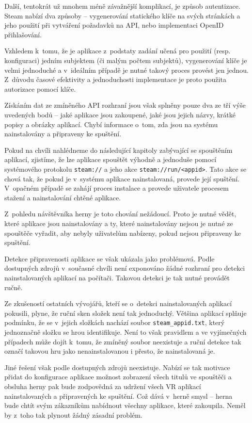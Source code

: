 Další, tentokrát už mnohem méně závažnější komplikací, je způsob
autentizace. Steam nabízí dva způsoby
-- vygenerování statického klíče na svých stránkách a jeho použití
při vytváření požadavků na API, nebo implementaci OpenID přihlašování.

Vzhledem k~tomu, že je aplikace z~podstaty zadání učená pro použití
(resp. konfiguraci) jedním subjektem (či malým počtem subjektů),
vygenerování klíče je velmi jednoduché a v~ideálním případě je nutné
takový proces provést jen jednou. Z~důvodu časové efektivity a 
jednoduchosti implementace je proto použita autorizace pomocí klíče.

Získáním dat ze zmíněného API rozhraní jsou však splněny pouze dva
ze tří výše uvedených bodů -- jaké aplikace jsou zakoupené, jaké jsou
jejich názvy, krátké popisy a obrázky aplikací. Chybí informace o~tom,
zda jsou na systému nainstalovány a připraveny ke spuštění.

Pokud na chvíli nahlédneme do následující kapitoly zabývající se
spouštěním aplikací, zjistíme, že lze aplikace spouštět výhodně a jednoduše pomocí systémového protokolu \texttt{steam://} a jeho akce
\texttt{steam://run/<appid>}. Tato akce se chová
tak, že pokud je v~systému aplikace nainstalovaná, provede její
spuštění. V~opačném případě se zahájí proces instalace a provede
uživatele procesem stažení a nainstalování chtěné aplikace. 

Z~pohledu návštěvníka herny je toto chování nežádoucí. Proto je nutné vědět, které aplikace jsou nainstalovány a ty, které nainstalovány
nejsou je nutné ze spouštěče vyřadit, aby nebyly uživatelům nabízeny,
pokud nejsou připraveny ke spuštění.

Detekce připravenosti aplikace se však ukázala jako
problémová. Podle dostupných zdrojů v~současné chvíli není exponováno
žádné rozhraní pro detekci nainstalovaných aplikací na počítači. 
Takovou detekci je tak nutné provádět ručně. 

Ze zkušeností ostatních vývojářů, kteří se o~detekci nainstalovaných aplikací pokusili,
plyne, že ruční sken složek není tak jednoduchý. \autocite{hardgamedetection} Většina aplikací splňuje
podmínku, že se v~jejich složkách nachází soubor
\texttt{steam\_appid.txt}, který jednoznačně složku se hrou
identifikuje. Není to však pravidlem a ve vyjímečných případech může
dojít k~tomu, že zmíněný soubor neexistuje a ruční detekce tak 
označí takovou hru jako nenainstalovanou i přesto, že nainstalovaná je.

Jiné řešení však podle dostupných zdrojů neexistuje. Nabízí se tak
motivace přidat do konfigurace aplikace možnost zobrazení všech titulů
ve spouštěči a obsluha herny pak bude zodpovědná za udržení všech VR aplikací 
nainstalovaných a připravených ke spuštění. Což dává v~herně smysl --
herna bude chtít svým zákazníkům nabídnout všechny aplikace, které
zakoupila. Neměl by z~toho tak plynout žádný zásadní problém.

